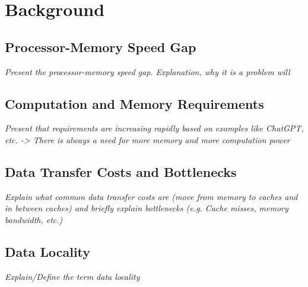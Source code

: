 \section{Background}\label{sec:background}

\subsection{Processor-Memory Speed Gap}\label{sec:pmgap}
\textit{Present the processor-memory speed gap. Explanation, why it is a problem will }

\subsection{Computation and Memory Requirements}\label{sec:comp_mem_req}
\textit{Present that requirements are increasing rapidly based on examples like ChatGPT, etc. -> There is always a need for more memory and more computation power}

\subsection{Data Transfer Costs and Bottlenecks}\label{sec:data_transfer}
\textit{Explain what common data transfer costs are (move from memory to caches and in between caches) and briefly explain bottlenecks (e.g. Cache misses, memory bandwidth, etc.)}

\subsection{Data Locality}\label{sec:data_locality}
\textit{Explain/Define the term data locality}
